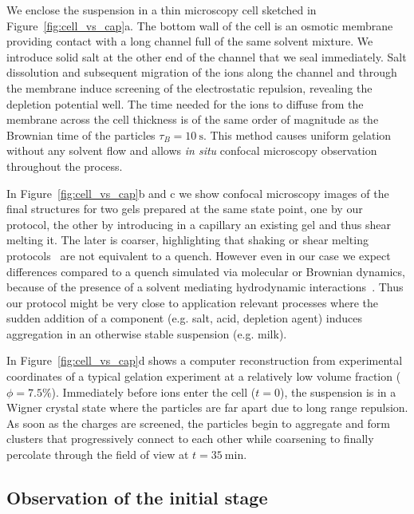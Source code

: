 We enclose the suspension in a thin microscopy cell sketched in Figure~\ref{fig:cell_vs_cap}a. The bottom wall of the cell is an osmotic membrane providing contact with a long channel full of the same solvent mixture. We introduce solid salt at the other end of the channel that we seal immediately. Salt dissolution and subsequent migration of the ions along the channel and through the membrane induce screening of the electrostatic repulsion, revealing the depletion potential well. The time needed for the ions to diffuse from the membrane across the cell thickness is of the same order of magnitude as the Brownian time of the particles $\tau_B=\SI{10}{\second}$. This method causes uniform gelation without any solvent flow and allows \textit{in situ} confocal microscopy observation throughout the process.

In Figure~\ref{fig:cell_vs_cap}b and c we show confocal microscopy images of the final structures for two gels prepared at the same state point, one by our protocol, the other by introducing in a capillary an existing gel and thus shear melting it. The later is coarser, highlighting that shaking or shear melting protocols~\cite{lu2008gelation,Teece2011,Bartlett2012} are not equivalent to a quench. However even in our case we expect differences compared to a quench simulated via molecular or Brownian dynamics, because of the presence of a solvent mediating hydrodynamic interactions~\cite{Furukawa2010}. Thus our protocol might be very close to application relevant processes where the sudden addition of a component (e.g. salt, acid, depletion agent) induces aggregation in an otherwise stable suspension (e.g. milk).

In Figure~\ref{fig:cell_vs_cap}d shows a computer reconstruction from experimental coordinates of a typical gelation experiment at a relatively low volume fraction ($\phi=7.5\%$). Immediately before ions enter the cell ($t=0$), the suspension is in a Wigner crystal state where the particles are far apart due to long range repulsion. As soon as the charges are screened, the particles begin to aggregate and form clusters that progressively connect to each other while coarsening to finally percolate through the field of view at $t=\SI{35}{\minute}$.


\subsection*{Observation of the initial stage}

